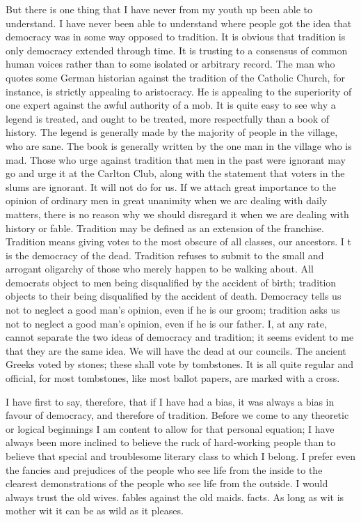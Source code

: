 \documentclass{book}
\begin{document}
But there is one thing that I have never from my youth up been able to understand. I have never been able to understand where people got the idea that democracy was in some way opposed to tradition. It is obvious that tradition is only democracy extended through time. It is trusting to a consensus of common human voices rather than to some isolated or arbitrary record. The man who quotes some German historian against the tradition of the Catholic Church, for instance, is strictly appealing to aristocracy. He is appealing to the superiority of one expert against the awful authority of a mob. It is quite easy to see why a legend is treated, and ought to be treated, more respectfully than a book of history. The legend is generally made by the majority of people in the village, who are sane. The book is generally written by the one man in the village who is mad. Those who urge against tradition that men in the past were ignorant may go and urge it at the Carlton Club, along with the statement that voters in the slums are ignorant. It will not do for us. If we attach great importance to the opinion of ordinary men in great unanimity when we arc dealing with daily matters, there is no reason why we should disregard it when we are dealing with history or fable. Tradition may be defined as an extension of the franchise. Tradition means giving votes to the most obscure of all classes, our ancestors. I t is the democracy of the dead. Tradition refuses to submit to the small and arrogant oligarchy of those who merely happen to be walking about. All democrats object to men being disqualified by the accident of birth; tradition objects to their being disqualified by the accident of death. Democracy tells us not to neglect a good man’s opinion, even if he is our groom; tradition asks us not to neglect a good man’s opinion, even if he is our father. I, at any rate, cannot separate the two ideas of democracy and tradition; it seems evident to me that they are the same idea. We will have thc dead at our councils. The ancient Greeks voted by stones; these shall vote by tombstones. It is all quite regular and official, for most tombstones, like most ballot papers, are marked with a cross.

I have first to say, therefore, that if I have had a bias, it was always a bias in favour of democracy, and therefore of tradition. Before we come to any theoretic or logical beginnings I am content to allow for that personal equation; I have always been more inclined to believe the ruck of hard-working people than to believe that special and troublesome literary class to which I belong. I prefer even the fancies and prejudices of the people who see life from the inside to the clearest demonstrations of the people who see life from the outside. I would always trust the old wives. fables against the old maids. facts. As long as wit is mother wit it can be as wild as it pleases.
\end{document}
